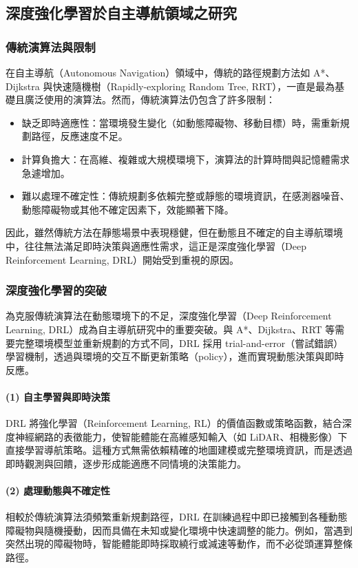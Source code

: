 \documentclass[12pt,a4paper]{article}
\begin{document}
\subsection{深度強化學習於自主導航領域之研究}

\subsubsection{傳統演算法與限制}
在自主導航（Autonomous Navigation）領域中，傳統的路徑規劃方法如 A*、Dijkstra 與快速隨機樹（Rapidly-exploring Random Tree, RRT），一直是最為基礎且廣泛使用的演算法。然而，傳統演算法仍包含了許多限制：
\begin{itemize}
  \item 缺乏即時適應性：當環境發生變化（如動態障礙物、移動目標）時，需重新規劃路徑，反應速度不足。
  \item 計算負擔大：在高維、複雜或大規模環境下，演算法的計算時間與記憶體需求急遽增加。
  \item 難以處理不確定性：傳統規劃多依賴完整或靜態的環境資訊，在感測器噪音、動態障礙物或其他不確定因素下，效能顯著下降。
\end{itemize}

因此，雖然傳統方法在靜態場景中表現穩健，但在動態且不確定的自主導航環境中，往往無法滿足即時決策與適應性需求，這正是深度強化學習（Deep Reinforcement Learning, DRL）開始受到重視的原因。


\subsubsection{深度強化學習的突破}
為克服傳統演算法在動態環境下的不足，深度強化學習（Deep Reinforcement Learning, DRL）成為自主導航研究中的重要突破。與 A*、Dijkstra、RRT 等需要完整環境模型並重新規劃的方式不同，DRL 採用 trial-and-error（嘗試錯誤）學習機制，透過與環境的交互不斷更新策略（policy），進而實現動態決策與即時反應。

\paragraph{(1) 自主學習與即時決策}
DRL 將強化學習（Reinforcement Learning, RL）的價值函數或策略函數，結合深度神經網路的表徵能力，使智能體能在高維感知輸入（如 LiDAR、相機影像）下直接學習導航策略。這種方式無需依賴精確的地圖建模或完整環境資訊，而是透過即時觀測與回饋，逐步形成能適應不同情境的決策能力。

\paragraph{(2) 處理動態與不確定性}
相較於傳統演算法須頻繁重新規劃路徑，DRL 在訓練過程中即已接觸到各種動態障礙物與隨機擾動，因而具備在未知或變化環境中快速調整的能力。例如，當遇到突然出現的障礙物時，智能體能即時採取繞行或減速等動作，而不必從頭運算整條路徑。
\end{document}
